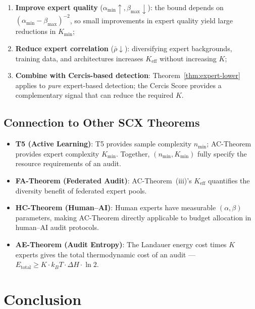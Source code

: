 \documentclass[12pt,a4paper]{article}
\begin{document}
\begin{enumerate}[label=(\roman*)]
    \item \textbf{Improve expert quality} ($\alpha_{\min}\uparrow,\beta_{\max}\downarrow$):
          the bound depends on $(\alpha_{\min}-\beta_{\max})^{-2}$, so small
          improvements in expert quality yield large reductions in $K_{\min}$;
    \item \textbf{Reduce expert correlation} ($\bar{\rho}\downarrow$):
          diversifying expert backgrounds, training data, and architectures
          increases $K_{\mathrm{eff}}$ without increasing $K$;
    \item \textbf{Combine with Cercis-based detection}: Theorem~\ref{thm:expert-lower}
          applies to \emph{pure} expert-based detection; the Cercis Score provides
          a complementary signal that can reduce the required $K$.
\end{enumerate}

\subsection{Connection to Other SCX Theorems}

\begin{itemize}
    \item \textbf{T5 (Active Learning)}: T5 provides sample complexity $n_{\min}$;
          AC-Theorem provides expert complexity $K_{\min}$.  Together,
          $(n_{\min},K_{\min})$ fully specify the resource requirements of an
          audit.
    \item \textbf{FA-Theorem (Federated Audit)}: AC-Theorem~(iii)'s $K_{\mathrm{eff}}$
          quantifies the diversity benefit of federated expert pools.
    \item \textbf{HC-Theorem (Human--AI)}: Human experts have measurable
          $(\alpha,\beta)$ parameters, making AC-Theorem directly applicable to
          budget allocation in human--AI audit protocols.
    \item \textbf{AE-Theorem (Audit Entropy)}: The Landauer energy cost times
          $K$ experts gives the total thermodynamic cost of an audit —
          $E_{\mathrm{total}}\geq K\cdot k_B T\cdot\Delta H\cdot\ln2$.
\end{itemize}

\section{Conclusion}
\end{document}
